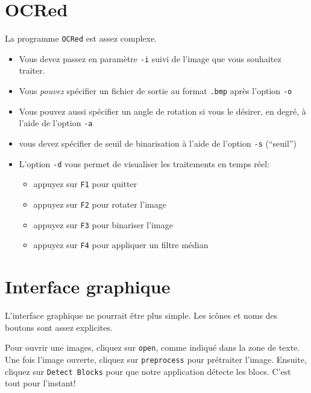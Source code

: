 \documentclass[a4paper,12pt]{report}
\begin{document}
\chapter{OCRed} %
\label{cha:ocred}

La programme \verb!OCRed! est assez complexe.

\begin{itemize}
	\item Vous devez passez en param\`etre \verb!-i! suivi de l'image que vous souhaitez traiter.
	\item Vous \emph{pouvez} sp\'ecifier un fichier de sortie au format \verb!.bmp! apr\`es l'option \verb!-o!
	\item Vous pouvez aussi sp\'ecifier un angle de rotation si vous le d\'esirer, en degr\'e, \`a l'aide de l'option \verb!-a!
	\item vous devez sp\'ecifier de seuil de binarisation \`a l'aide de l'option \verb!-s! (``seuil'')
	\item L'option \verb!-d! vous permet de visualiser les traitements en temps r\'eel:
	\begin{itemize}
		\item appuyez sur \verb!F1! pour quitter
		\item appuyez sur \verb!F2! pour rotater l'image
		\item appuyez sur \verb!F3! pour binariser l'image
		\item appuyez sur \verb!F4! pour appliquer un filtre m\'edian
	\end{itemize}
\end{itemize}


\chapter{Interface graphique} %
\label{cha:interface_graphique}

L'interface graphique ne pourrait \^etre plus simple. Les ic\^ones et noms des boutons sont assez explicites. 

Pour ouvrir une images, cliquez sur \verb!open!, comme indiqu\'e dans la zone de texte. Une fois l'image ouverte, cliquez sur \verb!preprocess! pour pr\'etraiter l'image. Ensuite, cliquez sur \verb!Detect Blocks! pour que notre application détecte les blocs. C'est tout pour l'instant!
\end{document}
